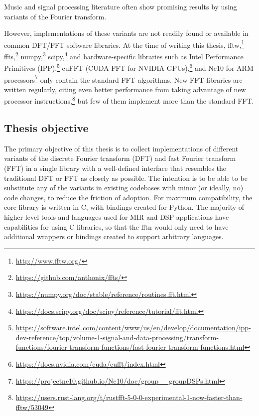\documentclass[letter,12pt]{article}
\begin{document}
Music and signal processing literature often show promising results by using variants of the Fourier transform.

However, implementations of these variants are not readily found or available in common DFT/FFT software libraries. At the time of writing this thesis, fftw,\footnote{\href{http://www.fftw.org/}{http://www.fftw.org/}} ffts,\footnote{\href{https://github.com/anthonix/ffts/}{https://github.com/anthonix/ffts/}} numpy,\footnote{\href{https://numpy.org/doc/stable/reference/routines.fft.html}{https://numpy.org/doc/stable/reference/routines.fft.html}} scipy,\footnote{\href{https://docs.scipy.org/doc/scipy/reference/tutorial/fft.html}{https://docs.scipy.org/doc/scipy/reference/tutorial/fft.html}} and hardware-specific libraries such as Intel Performance Primitives (IPP),\footnote{\href{https://software.intel.com/content/www/us/en/develop/documentation/ipp-dev-reference/top/volume-1-signal-and-data-processing/transform-functions/fourier-transform-functions/fast-fourier-transform-functions.html}{https://software.intel.com/content/www/us/en/develop/documentation/ipp-dev-reference/top/volume-1-signal-and-data-processing/transform-functions/fourier-transform-functions/fast-fourier-transform-functions.html}} cuFFT (CUDA FFT for NVIDIA GPUs),\footnote{\href{https://docs.nvidia.com/cuda/cufft/index.html}{https://docs.nvidia.com/cuda/cufft/index.html}} and Ne10 for ARM processors\footnote{\href{https://projectne10.github.io/Ne10/doc/group__groupDSPs.html}{https://projectne10.github.io/Ne10/doc/group\_\_groupDSPs.html}} only contain the standard FFT algorithms. New FFT libraries are written regularly, citing even better performance from taking advantage of new processor instructions,\footnote{\href{https://users.rust-lang.org/t/rustfft-5-0-0-experimental-1-now-faster-than-fftw/53049}{https://users.rust-lang.org/t/rustfft-5-0-0-experimental-1-now-faster-than-fftw/53049}} but few of them implement more than the standard FFT.

\subsection{Thesis objective}

The primary objective of this thesis is to collect implementations of different variants of the discrete Fourier transform (DFT) and fast Fourier transform (FFT) in a single library with a well-defined interface that resembles the traditional DFT or FFT as closely as possible. The intention is to be able to be substitute any of the variants in existing codebases with minor (or ideally, no) code changes, to reduce the friction of adoption. For maximum compatibility, the core library is written in C, with bindings created for Python. The majority of higher-level tools and languages used for MIR and DSP applications have capabilities for using C libraries, so that the fftn would only need to have additional wrappers or bindings created to support arbitrary languages. 
\end{document}
